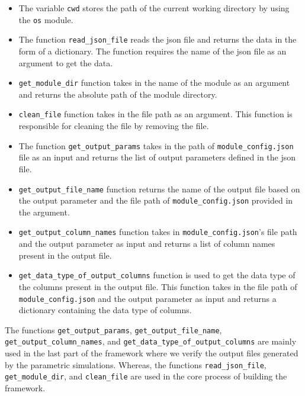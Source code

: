 \begin{itemize}
    \item The variable \texttt{cwd} stores the path of the current working directory by using the \texttt{os} module.  
    \item The function \texttt{read\_json\_file} reads the \acrshort{json} file and returns the data in the form of a dictionary. The function requires the 
    name of the \acrshort{json} file as an argument to get the data.
    \item \texttt{get\_module\_dir} function takes in the name of the module as an argument and returns the absolute path of the module directory.
    \item \texttt{clean\_file} function takes in the file path as an argument. This function is responsible for cleaning the file by removing the file.
    \item The function \texttt{get\_output\_params} takes in the path of \texttt{module\_config.json} file as an input and returns the list of output parameters
    defined in the \acrshort{json} file.
    \item \texttt{get\_output\_file\_name} function returns the name of the output file based on the output parameter and the file path of \texttt{module\_config.json} 
    provided in the argument.
    \item \texttt{get\_output\_column\_names} function takes in \texttt{module\_config.json}'s file path and the output parameter as input and returns a list 
    of column names present in the output file.
    \item \texttt{get\_data\_type\_of\_output\_columns} function is used to get the data type of the columns present in the output file. This function takes in
    the file path of \texttt{module\_config.json} and the output parameter as input and returns a dictionary containing the data type of columns. 
  \end{itemize}

  The functions \texttt{get\_output\_params}, \texttt{get\_output\_file\_name}, \texttt{get\_output\_column\_names}, and \texttt{get\_data\_type\_of\_output\_columns}
  are mainly used in the last part of the framework where we verify the output files generated by the parametric simulations. Whereas, the functions 
  \texttt{read\_json\_file}, \texttt{get\_module\_dir}, and \texttt{clean\_file} are used in the core process of building the framework.


